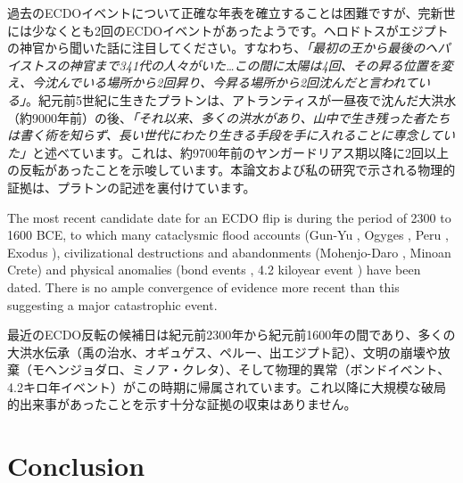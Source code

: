 \documentclass[10pt,twocolumn,letterpaper]{article}
\begin{document}
過去のECDOイベントについて正確な年表を確立することは困難ですが、完新世には少なくとも2回のECDOイベントがあったようです。ヘロドトスがエジプトの神官から聞いた話に注目してください。すなわち、\textit{「最初の王から最後のヘパイストスの神官まで341代の人々がいた…この間に太陽は4回、その昇る位置を変え、今沈んでいる場所から2回昇り、今昇る場所から2回沈んだと言われている」}\cite{32}。紀元前5世紀に生きたプラトン\cite{111}は、アトランティスが一昼夜で沈んだ大洪水（約9000年前）の後、\textit{「それ以来、多くの洪水があり、山中で生き残った者たちは書く術を知らず、長い世代にわたり生きる手段を手に入れることに専念していた」}\cite{112}と述べています。これは、約9700年前のヤンガードリアス期以降に2回以上の反転があったことを示唆しています。本論文および私の研究\cite{2}で示される物理的証拠は、プラトンの記述を裏付けています。

The most recent candidate date for an ECDO flip is during the period of 2300 to 1600 BCE, to which many cataclysmic flood accounts (Gun-Yu \cite{113,114,115}, Ogyges \cite{116,117}, Peru \cite{118,119}, Exodus \cite{120}), civilizational destructions and abandonments (Mohenjo-Daro \cite{121}, Minoan Crete\cite{100,101}) and physical anomalies (bond events \cite{122}, 4.2 kiloyear event \cite{90}) have been dated. There is no ample convergence of evidence more recent than this suggesting a major catastrophic event.

最近のECDO反転の候補日は紀元前2300年から紀元前1600年の間であり、多くの大洪水伝承（禹の治水\cite{113,114,115}、オギュゲス\cite{116,117}、ペルー\cite{118,119}、出エジプト記\cite{120}）、文明の崩壊や放棄（モヘンジョダロ\cite{121}、ミノア・クレタ\cite{100,101}）、そして物理的異常（ボンドイベント\cite{122}、4.2キロ年イベント\cite{90}）がこの時期に帰属されています。これ以降に大規模な破局的出来事があったことを示す十分な証拠の収束はありません。

\section{Conclusion}
\end{document}
